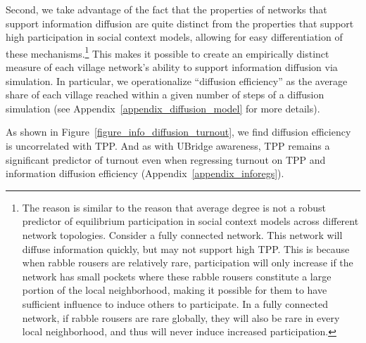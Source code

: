 \documentclass[12pt]{article}
\begin{document}
Second, we take advantage of the fact that the properties of networks that support information diffusion are quite distinct from the properties that support high participation in social context models, allowing for easy differentiation of these mechanisms.\footnote{The reason is similar to the reason that average degree is not a robust predictor of equilibrium participation in social context models across different network topologies. Consider a fully connected network. This network will diffuse information quickly, but may not support high TPP. This is because when rabble rousers are relatively rare, participation will only increase if the network has small pockets where these rabble rousers constitute a large portion of the local neighborhood, making it possible for them to have sufficient influence to induce others to participate. In a fully connected network, if rabble rousers are rare globally, they will also be rare in every local neighborhood, and thus will never induce increased participation.} This makes it possible to create an empirically distinct measure of each village network's ability to support information diffusion via simulation. In particular, we operationalize ``diffusion efficiency'' as the average share of each village reached within a given number of steps of a diffusion simulation (see Appendix~\ref{appendix_diffusion_model} for more details).

As shown in Figure~\ref{figure_info_diffusion_turnout}, we find diffusion efficiency is uncorrelated with TPP. And as with UBridge awareness, TPP remains a significant predictor of turnout even when regressing turnout on TPP and information diffusion efficiency (Appendix~\ref{appendix_inforegs}).
\end{document}
